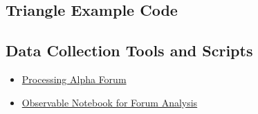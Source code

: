 \appendix
\subsection{Triangle Example Code}


\subsection{Data Collection Tools and Scripts}

\begin{itemize}
    \item \href{https://forum.processing.org/alpha/}{Processing Alpha Forum}
    \item \href{https://observablehq.com/d/042b1cf42ea9bb5e}{Observable Notebook for Forum Analysis}
\end{itemize}
